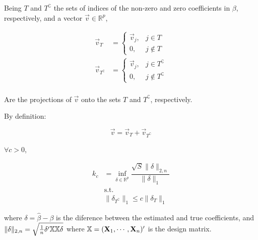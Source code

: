 \begin{Def}
Being $T$ and $T^{\complement}$ the sets of indices of the non-zero and zero coefficients in $\beta$, respectively, and a vector $\Vec{v} \in \mathbb{R}^p$, 

\begin{align*}
    \Vec{v}_T &= \begin{cases}
        \Vec{v}_j, &  j \in T \\
        0, &  j \notin T
    \end{cases}\\
    \Vec{v}_{T^{\complement}} &= \begin{cases}
        \Vec{v}_j, &  j \in T^{\complement}\\
        0, &  j \notin T^{\complement}
    \end{cases}\\
\end{align*}

Are the projections of $\Vec{v}$ onto the sets $T$ and $T^{\complement}$, respectively.

By definition:

\[
\Vec{v} = \Vec{v}_T + \Vec{v}_{T^{\complement}}
\]
\end{Def}

\begin{Def}
$\forall c > 0$,

\begin{align*}
k_c &= \inf_{\delta \in \mathbb{R}^p}{
    \dfrac{\sqrt{S} \|\delta\|_{2, n}}{\|\delta\|_1}
}\\
&\text{s.t.}\\
&\|\delta_{T^{\complement}}\|_1 \leq c \|\delta_T\|_1
\end{align*}

where $\delta = \hat{\beta} - \beta$ is the diference between the estimated and true coefficients, and $\|\delta\|_{2, n} = \sqrt{\frac{1}{n} \delta'\mathbb{X}\mathbb{X}\delta}$ where $\mathbb{X} = (\mathbf{X}_1, \cdots, \mathbf{X}_n)'$ is the design matrix.
\end{Def}

